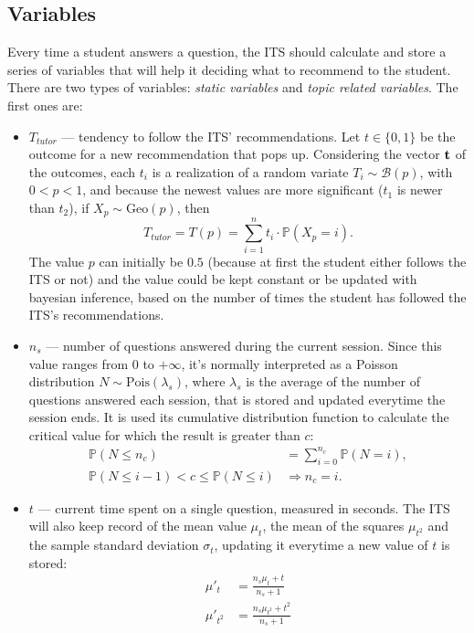 \documentclass{article}
\newcommand{\0}{\mathbbold{0}}
\newcommand{\1}{\mathds{1}}
\newcommand{\2}{\mathbbold{2}}
\begin{document}
\subsection{Variables}
Every time a student answers a question, the ITS should calculate and store a series of variables that will help it deciding what to recommend to the student.
There are two types of variables: \textsl{static variables} and \textsl{topic related variables}. The first ones are:
\begin{itemize}
    \item $T_\mathit{tutor}$ — tendency to follow the ITS' recommendations. Let $t \in \{0,1\}$ be the outcome for a new recommendation that pops up.
    Considering the vector ${\bf t}$ of the outcomes, each $t_i$ is a realization of a random variate $T_i \sim \mathcal{B}(p)$, with $0 < p < 1$, and because the newest values are more significant ($t_1$ is newer than $t_2$), if $X_p \sim \text{Geo}(p)$, then
    $$ T_\mathit{tutor} = T(p) = \sum_{i=1}^{n} t_i \cdot \mathbb{P}(X_p = i). $$
    The value $p$ can initially be $0.5$ (because at first the student either follows the ITS or not) and the value could be kept constant or be updated with bayesian inference, based on the number of times the student has followed the ITS's recommendations.
    \item $n_s$ — number of questions answered during the current session. Since this value ranges from $0$ to $+\infty$, it's normally interpreted as a Poisson distribution $N \sim \text{Pois}(\lambda_s)$, where $\lambda_s$ is the average of the number of questions answered each session, that is stored and updated everytime the session ends.
    It is used its cumulative distribution function to calculate the critical value for which the result is greater than $c$:
    \begin{align*}
        \mathbb{P}(N \le n_c) &= \sum_{i=0}^{n_c} \mathbb{P}(N = i), \\
        \mathbb{P}(N \le i-1) < c \le \mathbb{P}(N \le i) &\Rightarrow n_c = i.
    \end{align*}
    \item $t$ — current time spent on a single question, measured in seconds. The ITS will also keep record of the mean value $\mu_t$, the mean of the squares $\mu_{t^2}$ and the sample standard deviation $\sigma_t$, updating it everytime a new value of $t$ is stored:
    \begin{align*}
        \mu'_t &= \frac{n_s\mu_t + t}{n_s + 1} \\
        \mu'_{t^2} &= \frac{n_s\mu_{t^2} + t^2}{n_s + 1} \\

\end{align*}
\end{itemize}
\end{document}
